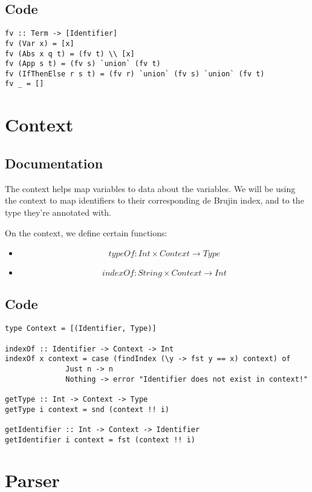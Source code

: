 \documentclass[11pt]{article}
\begin{document}
\subsection{Code}
\label{sec-2-2}
\begin{verbatim}
fv :: Term -> [Identifier]
fv (Var x) = [x]
fv (Abs x q t) = (fv t) \\ [x]
fv (App s t) = (fv s) `union` (fv t)
fv (IfThenElse r s t) = (fv r) `union` (fv s) `union` (fv t)
fv _ = []
\end{verbatim}


\section{Context}
\label{sec-3}
\subsection{Documentation}
\label{sec-3-1}
The context helps map variables to data about the variables. We will be using the context to map identifiers to their corresponding de Brujin index, and to the type they're annotated with.

On the context, we define certain functions:

\begin{itemize}
\item \[typeOf: Int \times Context \to Type\]
\item \[indexOf: String \times Context \to Int\]
\end{itemize}

\subsection{Code}
\label{sec-3-2}
\begin{verbatim}
type Context = [(Identifier, Type)]

indexOf :: Identifier -> Context -> Int
indexOf x context = case (findIndex (\y -> fst y == x) context) of
		      Just n -> n
		      Nothing -> error "Identifier does not exist in context!"

getType :: Int -> Context -> Type
getType i context = snd (context !! i)

getIdentifier :: Int -> Context -> Identifier
getIdentifier i context = fst (context !! i)
\end{verbatim}


\section{Parser}
\label{sec-4}
\end{document}
